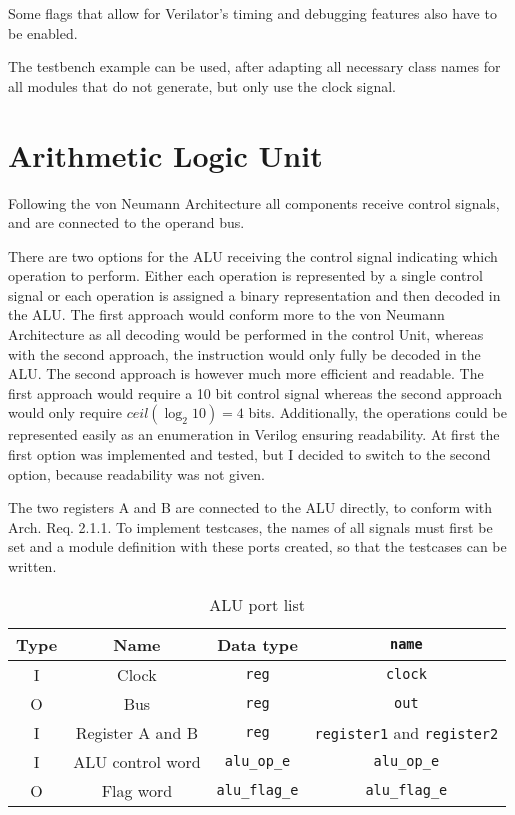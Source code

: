 Some flags that allow for Verilator's timing and debugging features also have to be enabled.

The testbench example can be used, after adapting all necessary class names for all modules that do not generate, but only use the clock signal.

\section{Arithmetic Logic Unit}
Following the von Neumann Architecture all components receive control signals, and are connected to the operand bus. 

There are two options for the ALU receiving the control signal indicating which operation to perform. Either each operation is represented by a single control signal or each operation is assigned a binary representation and then decoded in the ALU. The first approach would conform more to the von Neumann Architecture as all decoding would be performed in the control Unit, whereas with the second approach, the instruction would only fully be decoded in the ALU. The second approach is however much more efficient and readable. The first approach would require a 10 bit control signal whereas the second approach would only require $ceil(\log_2 10) = 4$ bits. Additionally, the operations could be represented easily as an enumeration in Verilog ensuring readability. At first the first option was implemented and tested, but I decided to switch to the second option, because readability was not given. 

The two registers A and B are connected to the ALU directly, to conform with Arch. Req. 2.1.1. To implement testcases, the names of all signals must first be set and a module definition with these ports created, so that the testcases can be written.

\begin{table}[H]
\begin{center}
\begin{tabular}{cccc}
  Type& Name & Data type & \texttt{name}\\ \hline
  I   & Clock & \texttt{reg} & \texttt{clock}\\
  O   & Bus     & \texttt{reg} & \texttt{out}        \\
  I   & Register A and B & \texttt{reg} & \texttt{register1} and \texttt{register2} \\
  I   & ALU control word & \texttt{alu\_op\_e} & \texttt{alu\_op\_e}\\
O   & Flag word & \texttt{alu\_flag\_e} & \texttt{alu\_flag\_e}
\end{tabular}
\end{center}
\caption{ALU port list}
\label{tab:alu-i/o}
\end{table}

